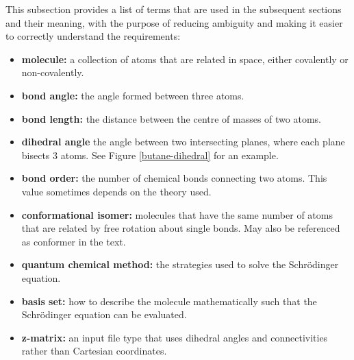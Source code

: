 \documentclass[12pt]{article}
\begin{document}
This subsection provides a list of terms that are used in the subsequent
sections and their meaning, with the purpose of reducing ambiguity and making it
easier to correctly understand the requirements:

 

\begin{itemize}
\item \textbf{molecule:} a collection of atoms that are related in space, 
either covalently or non-covalently.
\item \textbf{bond angle:} the angle formed between three atoms.
\item \textbf{bond length:} the distance between the centre of masses of two 
atoms.
\item \textbf{dihedral angle} the angle between two intersecting planes, where 
each plane bisects 3 atoms. See Figure \ref{butane-dihedral} for an example.
\item \textbf{bond order:} the number of chemical bonds connecting two atoms. 
This value sometimes depends on the theory used.
\item \textbf{conformational isomer:} molecules that have the same number of 
atoms that are related by free rotation about single bonds. May also be 
referenced as conformer in the text. 
\item \textbf{quantum chemical method:} the strategies used to solve the 
Schr\"{o}dinger equation.
\item \textbf{basis set:} how to describe the molecule mathematically such that 
the Schr\"{o}dinger equation can be evaluated.
\item \textbf{z-matrix:} an input file type that uses dihedral angles and 
connectivities rather than Cartesian coordinates.
\end{itemize}
\end{document}
